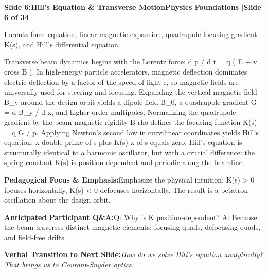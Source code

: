 \documentclass[11pt,a4paper]{article}
\begin{document}
\clearpage
\hypertarget{slide.6}{}
{}
\noindent\begin{tcolorbox}[colback=navy,colframe=navy,left=6pt,right=6pt,top=3pt,bottom=3pt,boxrule=0pt,arc=2pt]
{\large\bfseries\color{white}Slide 6:\enspace Hill's Equation \& Transverse Motion}\hfill{\footnotesize\bfseries\color{white!85!lightbg}Physics Foundations \enspace$|$\enspace Slide 6 of 34}
\end{tcolorbox}
\vspace{0.2em}
\begin{tcolorbox}[colback=lightbg,colframe=bordergray,title={\footnotesize\bfseries\color{darkgray}Slide Visual Blueprint},fontupper=\small,left=6pt,right=6pt,top=2.5pt,bottom=2.5pt,boxrule=0.6pt,arc=2.5pt]
Lorentz force equation, linear magnetic expansion, quadrupole focusing gradient K(s), and Hill's differential equation.
\end{tcolorbox}
\vspace{0.2em}
\begin{tcolorbox}[colback=white,colframe=primaryblue,title={\footnotesize\bfseries\color{white}Spoken Presenter Script},fontupper=\small,left=6pt,right=6pt,top=3pt,bottom=3pt,boxrule=0.8pt,arc=2.5pt]
Transverse beam dynamics begins with the Lorentz force: d p / d t = q ( E + v cross B ). In high-energy particle accelerators, magnetic deflection dominates electric deflection by a factor of the speed of light c, so magnetic fields are universally used for steering and focusing. Expanding the vertical magnetic field B\_y around the design orbit yields a dipole field B\_0, a quadrupole gradient G = d B\_y / d x, and higher-order multipoles. Normalizing the quadrupole gradient by the beam magnetic rigidity B-rho defines the focusing function K(s) = q G / p. Applying Newton's second law in curvilinear coordinates yields Hill's equation: x double-prime of s plus K(s) x of s equals zero. Hill's equation is structurally identical to a harmonic oscillator, but with a crucial difference: the spring constant K(s) is position-dependent and periodic along the beamline.
\end{tcolorbox}
\vspace{0.2em}
\begin{tcolorbox}[colback=lightbg,colframe=bordergray,left=6pt,right=6pt,top=3pt,bottom=3pt,boxrule=0.6pt,arc=2.5pt]
\small
\noindent\textbf{\color{navy}Pedagogical Focus \& Emphasis:}\enspace Emphasize the physical intuition: K(s) > 0 focuses horizontally, K(s) < 0 defocuses horizontally. The result is a betatron oscillation about the design orbit.\par\vspace{0.3em}
\noindent\textbf{\color{successgreen}Anticipated Participant Q\&A:}\enspace Q: Why is K position-dependent? A: Because the beam traverses distinct magnetic elements: focusing quads, defocusing quads, and field-free drifts.\par\vspace{0.3em}
\noindent\textbf{\color{accent}Verbal Transition to Next Slide:}\enspace \emph{How do we solve Hill's equation analytically? That brings us to Courant-Snyder optics.}
\end{tcolorbox}
\end{document}
